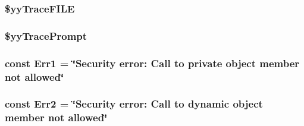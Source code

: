 \subsubsection[{\$yy\+Trace\+F\+I\+L\+E}]{\setlength{\rightskip}{0pt plus 5cm}\$yy\+Trace\+F\+I\+L\+E\hspace{0.3cm}{\ttfamily [static]}}\label{class_smarty___internal___templateparser_a186aaee74f33406312b25b51f86bae04}
\hypertarget{class_smarty___internal___templateparser_aa4ad5648a401cd049b70f63efcc4b5f3}{}
\subsubsection[{\$yy\+Trace\+Prompt}]{\setlength{\rightskip}{0pt plus 5cm}\$yy\+Trace\+Prompt\hspace{0.3cm}{\ttfamily [static]}}\label{class_smarty___internal___templateparser_aa4ad5648a401cd049b70f63efcc4b5f3}
\hypertarget{class_smarty___internal___templateparser_ad48df3d38f610b1b40edb2cf28e503ca}{}
\subsubsection[{Err1}]{\setlength{\rightskip}{0pt plus 5cm}const Err1 = \char`\"{}Security error\+: Call to private object member not allowed\char`\"{}}\label{class_smarty___internal___templateparser_ad48df3d38f610b1b40edb2cf28e503ca}
\hypertarget{class_smarty___internal___templateparser_aebecc92c77dadf855c9a946efd82c8c0}{}
\subsubsection[{Err2}]{\setlength{\rightskip}{0pt plus 5cm}const Err2 = \char`\"{}Security error\+: Call to dynamic object member not allowed\char`\"{}}\label{class_smarty___internal___templateparser_aebecc92c77dadf855c9a946efd82c8c0}
\hypertarget{class_smarty___internal___templateparser_a3553fc7ef4a922147894a638c20c5574}{}
